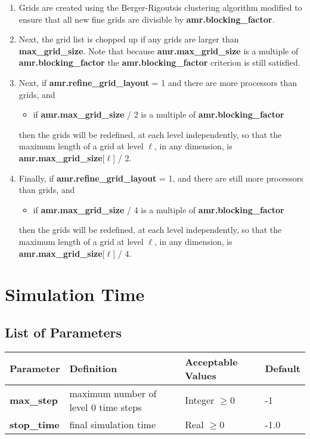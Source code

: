 \begin{enumerate}
\item Grids are created using the Berger-Rigoutsis clustering algorithm 
modified to ensure that all new fine grids are divisible by {\bf amr.blocking\_factor}.

\item Next, the grid list is chopped up if any grids are larger than {\bf max\_grid\_size}.
Note that because {\bf amr.max\_grid\_size} is a multiple of {\bf amr.blocking\_factor}
the {\bf amr.blocking\_factor} criterion is still satisfied. 

\item Next, if {\bf amr.refine\_grid\_layout} = 1 and there are more processors than grids, and
\begin{itemize}
\item if {\bf amr.max\_grid\_size} / 2 is a multiple of {\bf amr.blocking\_factor}
\end{itemize}
then the grids will be redefined, at each level independently, so that the 
maximum length of a grid at level $\ell$, in any dimension, 
is {\bf amr.max\_grid\_size}[$\ell$] / 2.  

\item Finally, if {\bf amr.refine\_grid\_layout} = 1,  and there are still more processors
than grids, and 
\begin{itemize}
\item if {\bf amr.max\_grid\_size} / 4 is a multiple of {\bf amr.blocking\_factor}
\end{itemize}
then the grids will be redefined, at each level independently, so that the 
maximum length of a grid at level $\ell$, in any dimension, 
is {\bf amr.max\_grid\_size}[$\ell$] / 4.


\end{enumerate}

\section{Simulation Time}

\subsection{List of Parameters}
\begin{table*}[h]
\begin{scriptsize}
\begin{center}
\begin{tabular}{|l|l|l|l|} \hline
Parameter & Definition & Acceptable Values &Default \\
\hline
{\bf max\_step} & maximum number of level 0 time steps & Integer $\geq 0$ & -1 \\
{\bf stop\_time} & final simulation time & Real $\geq 0$ & -1.0 \\
\hline
\end{tabular}
\label{Table:TimeInputs}
\end{center}
\end{scriptsize}
\end{table*}

